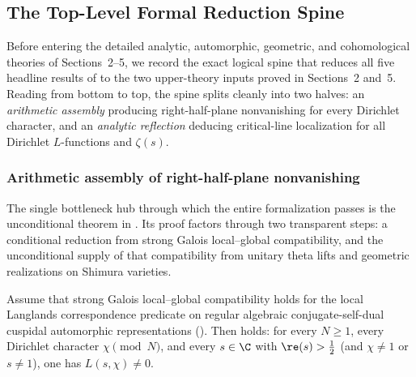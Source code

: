 \subsection{The Top-Level Formal Reduction Spine}
\label{subsec:ch01-spine}

Before entering the detailed analytic, automorphic, geometric, and
cohomological theories of Sections~2--5, we record the exact logical spine that
reduces all five headline results of  to the two upper-theory
inputs proved in Sections~2 and~5.
Reading from bottom to top, the spine splits cleanly into two halves: an
\emph{arithmetic assembly} producing right-half-plane nonvanishing for every
Dirichlet character, and an \emph{analytic reflection} deducing critical-line
localization for all Dirichlet $L$-functions and $\zeta(s)$.

\subsubsection{Arithmetic assembly of right-half-plane nonvanishing}

The single bottleneck hub through which the entire formalization passes is the
unconditional theorem  in
.
Its proof factors through two transparent steps: a conditional reduction from
strong Galois local--global compatibility, and the unconditional supply of that
compatibility from unitary theta lifts and geometric realizations on Shimura
varieties.

\begin{proposition}
\label{prop:ch01-every-of-row}
Assume that strong Galois local--global compatibility holds for the local
Langlands correspondence predicate  on
regular algebraic conjugate-self-dual cuspidal automorphic representations
().
Then  holds: for every $N \ge 1$, every
Dirichlet character $\chi \pmod{N}$, and every $s \in \C$ with
$\re(s) > \tfrac{1}{2}$ (and $\chi \neq 1$ or $s \neq 1$), one has
$L(s, \chi) \neq 0$.
\end{proposition}

